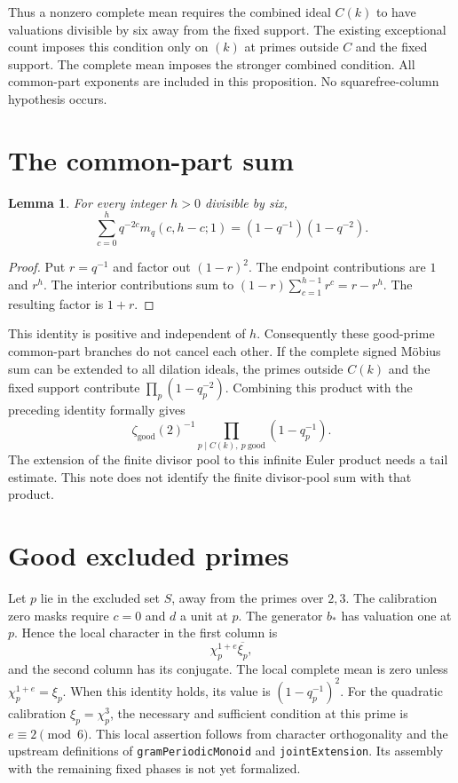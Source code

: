 \documentclass{article}
\newtheorem{lemma}{Lemma}
\begin{document}
Thus a nonzero complete mean requires the combined ideal $C(k)$ to have
valuations divisible by six away from the fixed support.
The existing exceptional count imposes this condition only on $(k)$ at primes
outside $C$ and the fixed support.
The complete mean imposes the stronger combined condition.
All common-part exponents are included in this proposition.
No squarefree-column hypothesis occurs.

\section*{The common-part sum}

\begin{lemma}
For every integer $h>0$ divisible by six,
\[
 \sum_{c=0}^h q^{-2c}m_q(c,h-c;1)
 =(1-q^{-1})(1-q^{-2}).
\]
\end{lemma}

\begin{proof}
Put $r=q^{-1}$ and factor out $(1-r)^2$.
The endpoint contributions are $1$ and $r^h$.
The interior contributions sum to
$(1-r)\sum_{c=1}^{h-1}r^c=r-r^h$.
The resulting factor is $1+r$.
\end{proof}

This identity is positive and independent of $h$.
Consequently these good-prime common-part branches do not cancel each other.
If the complete signed M\"obius sum can be extended to all dilation ideals,
the primes outside $C(k)$ and the fixed support contribute
$\prod_p(1-q_p^{-2})$.
Combining this product with the preceding identity formally gives
\[
 \zeta_{\mathrm{good}}(2)^{-1}
 \prod_{p\mid C(k),\ p\ \mathrm{good}}(1-q_p^{-1}).
\]
The extension of the finite divisor pool to this infinite Euler product needs
a tail estimate.
This note does not identify the finite divisor-pool sum with that product.

\section*{Good excluded primes}

Let $p$ lie in the excluded set $S$, away from the primes over $2,3$.
The calibration zero masks require $c=0$ and $d$ a unit at $p$.
The generator $b_*$ has valuation one at $p$.
Hence the local character in the first column is
\[
 \chi_p^{1+e}\overline{\xi_p},
\]
and the second column has its conjugate.
The local complete mean is zero unless $\chi_p^{1+e}=\xi_p$.
When this identity holds, its value is $(1-q_p^{-1})^2$.
For the quadratic calibration $\xi_p=\chi_p^3$, the necessary and sufficient
condition at this prime is $e\equiv2\pmod6$.
This local assertion follows from character orthogonality and the upstream
definitions of \texttt{gramPeriodicMonoid} and \texttt{jointExtension}.
Its assembly with the remaining fixed phases is not yet formalized.
\end{document}
